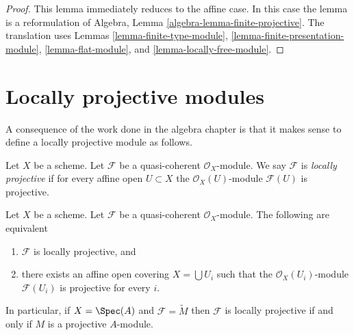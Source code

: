 \begin{proof}
This lemma immediately reduces to the affine case.
In this case the lemma is a reformulation of
Algebra, Lemma \ref{algebra-lemma-finite-projective}.
The translation uses
Lemmas \ref{lemma-finite-type-module},
\ref{lemma-finite-presentation-module},
\ref{lemma-flat-module}, and
\ref{lemma-locally-free-module}.
\end{proof}






\section{Locally projective modules}
\label{section-locally-projective}

\noindent
A consequence of the work done in the algebra chapter is that it
makes sense to define a locally projective module as follows.

\begin{definition}
\label{definition-locally-projective}
Let $X$ be a scheme. Let $\mathcal{F}$ be a quasi-coherent
$\mathcal{O}_X$-module. We say $\mathcal{F}$ is {\it locally projective}
if for every affine open $U \subset X$ the $\mathcal{O}_X(U)$-module
$\mathcal{F}(U)$ is projective.
\end{definition}

\begin{lemma}
\label{lemma-locally-projective}
Let $X$ be a scheme.
Let $\mathcal{F}$ be a quasi-coherent $\mathcal{O}_X$-module.
The following are equivalent
\begin{enumerate}
\item $\mathcal{F}$ is locally projective, and
\item there exists an affine open covering $X = \bigcup U_i$
such that the $\mathcal{O}_X(U_i)$-module
$\mathcal{F}(U_i)$ is projective for every $i$.
\end{enumerate}
In particular, if $X = \Spec(A)$ and $\mathcal{F} = \widetilde{M}$
then $\mathcal{F}$ is locally projective if and only if $M$ is a projective
$A$-module.
\end{lemma}

